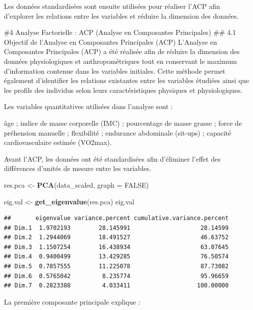 \documentclass[
]{article}
\newenvironment{Shaded}{\begin{snugshade}}{\end{snugshade}}
\newcommand{\AttributeTok}[1]{\textcolor[rgb]{0.13,0.29,0.53}{#1}}
\newcommand{\ConstantTok}[1]{\textcolor[rgb]{0.56,0.35,0.01}{#1}}
\newcommand{\FunctionTok}[1]{\textcolor[rgb]{0.13,0.29,0.53}{\textbf{#1}}}
\newcommand{\NormalTok}[1]{#1}
\newcommand{\OtherTok}[1]{\textcolor[rgb]{0.56,0.35,0.01}{#1}}
\begin{document}
Les données standardisées sont ensuite utilisées pour réaliser l'ACP
afin d'explorer les relations entre les variables et réduire la
dimension des données.

\#4 Analyse Factorielle : ACP (Analyse en Composantes Principales) \#\#
4.1 Objectif de l'Analyse en Composantes Principales (ACP) L'Analyse en
Composantes Principales (ACP) a été réalisée afin de réduire la
dimension des données physiologiques et anthropométriques tout en
conservant le maximum d'information contenue dans les variables
initiales. Cette méthode permet également d'identifier les relations
existantes entre les variables étudiées ainsi que les profils des
individus selon leurs caractéristiques physiques et physiologiques.

Les variables quantitatives utilisées dans l'analyse sont :

âge ; indice de masse corporelle (IMC) ; pourcentage de masse grasse ;
force de préhension manuelle ; flexibilité ; endurance abdominale
(sit-ups) ; capacité cardiovasculaire estimée (VO2max).

Avant l'ACP, les données ont été standardisées afin d'éliminer l'effet
des différences d'unités de mesure entre les variables.

\begin{Shaded}
\begin{Highlighting}[]
\NormalTok{res.pca }\OtherTok{\textless{}{-}} \FunctionTok{PCA}\NormalTok{(data\_scaled, }\AttributeTok{graph =} \ConstantTok{FALSE}\NormalTok{)}

\NormalTok{eig.val }\OtherTok{\textless{}{-}} \FunctionTok{get\_eigenvalue}\NormalTok{(res.pca)}
\NormalTok{eig.val}
\end{Highlighting}
\end{Shaded}

\begin{verbatim}
##       eigenvalue variance.percent cumulative.variance.percent
## Dim.1  1.9702193        28.145991                    28.14599
## Dim.2  1.2944069        18.491527                    46.63752
## Dim.3  1.1507254        16.438934                    63.07645
## Dim.4  0.9400499        13.429285                    76.50574
## Dim.5  0.7857555        11.225078                    87.73082
## Dim.6  0.5765042         8.235774                    95.96659
## Dim.7  0.2823388         4.033411                   100.00000
\end{verbatim}

La première composante principale explique :
\end{document}
